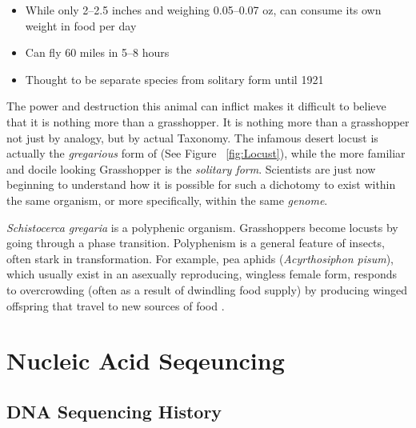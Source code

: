 \begin{itemize}
  \item While only 2–2.5 inches and weighing 0.05–0.07 oz, can consume its own weight in food per day
  \item Can fly 60 miles in 5–8 hours
  \item Thought to be separate species from solitary form until 1921 
\end{itemize}

The power and destruction this animal can inflict makes it difficult to believe that it is nothing more than a grasshopper. It is nothing more than a grasshopper not just by analogy, but by actual Taxonomy. The infamous desert locust is actually the \textit{gregarious} form  of \locusts{} (See Figure ~\ref{fig:Locust}), while the more familiar and docile looking Grasshopper is the \textit{solitary form}. Scientists are just now beginning to understand how it is possible for such a dichotomy to exist within the same organism, or more specifically, within the same \textit{genome}.

\textit{Schistocerca gregaria} is a polyphenic organism. Grasshoppers become locusts by going through a phase transition. Polyphenism is a general feature of insects, often stark in transformation. For example, pea aphids (\textit{Acyrthosiphon pisum}), which usually exist in an asexually reproducing, wingless female form, responds to overcrowding (often as a result of dwindling food supply) by producing winged offspring that travel to new sources of food \citep{Shingleton2003,Purandare2014b}.

\section{Nucleic Acid Seqeuncing}
\subsection{DNA Sequencing History} %

